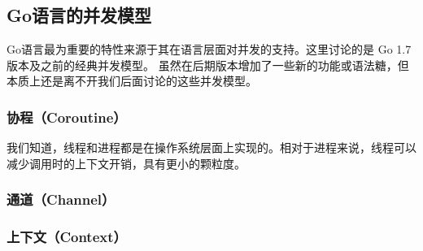 \documentclass[twoside]{CUGThesis}
\begin{document}
	\subsection{Go语言的并发模型}
	Go语言最为重要的特性来源于其在语言层面对并发的支持。这里讨论的是 Go 1.7 版本及之前的经典并发模型。
	虽然在后期版本增加了一些新的功能或语法糖，但本质上还是离不开我们后面讨论的这些并发模型。
	\subsubsection{协程（Coroutine）}
	我们知道，线程和进程都是在操作系统层面上实现的。相对于进程来说，线程可以减少调用时的上下文开销，具有更小的颗粒度。\par 

	\subsubsection{通道（Channel）}
	\subsubsection{上下文（Context）}
	
	
	
\end{document}

